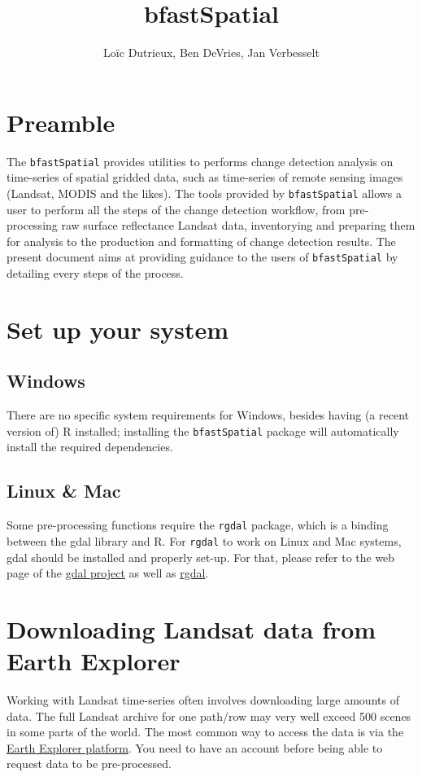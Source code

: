 \documentclass{article}\usepackage[]{graphicx}\usepackage[]{color}
\def\code#1{\texttt{#1}}
\begin{document}
\title{bfastSpatial}
\author{Lo\"{i}c Dutrieux, Ben DeVries, Jan Verbesselt}

\maketitle

\section{Preamble}
The \code{bfastSpatial} provides utilities to performs change detection analysis on time-series of spatial gridded data, such as time-series of remote sensing images (Landsat, MODIS and the likes). The tools provided by \code{bfastSpatial} allows a user to perform all the steps of the change detection workflow, from pre-processing raw surface reflectance Landsat data, inventorying and preparing them for analysis to the production and formatting of change detection results. The present document aims at providing guidance to the users of \code{bfastSpatial} by detailing every steps of the process.

\section{Set up your system}
\subsection{Windows}
There are no specific system requirements for Windows, besides having (a recent version of) R installed; installing the \code{bfastSpatial} package will automatically install the required dependencies.  
\subsection{Linux \& Mac}
Some pre-processing functions require the \code{rgdal} package, which is a binding between the gdal library and R. For \code{rgdal} to work on Linux and Mac systems, gdal should be installed and properly set-up. For that, please refer to the web page of the \href{http://www.gdal.org/}{gdal project} as well as \href{http://cran.r-project.org/web/packages/rgdal/index.html}{rgdal}.

\section{Downloading Landsat data from Earth Explorer}
Working with Landsat time-series often involves downloading large amounts of data. The full Landsat archive for one path/row may very well exceed 500 scenes in some parts of the world. The most common way to access the data is via the \href{http://earthexplorer.usgs.gov/}{Earth Explorer platform}. You need to have an account before being able to request data to be pre-processed.
\end{document}
